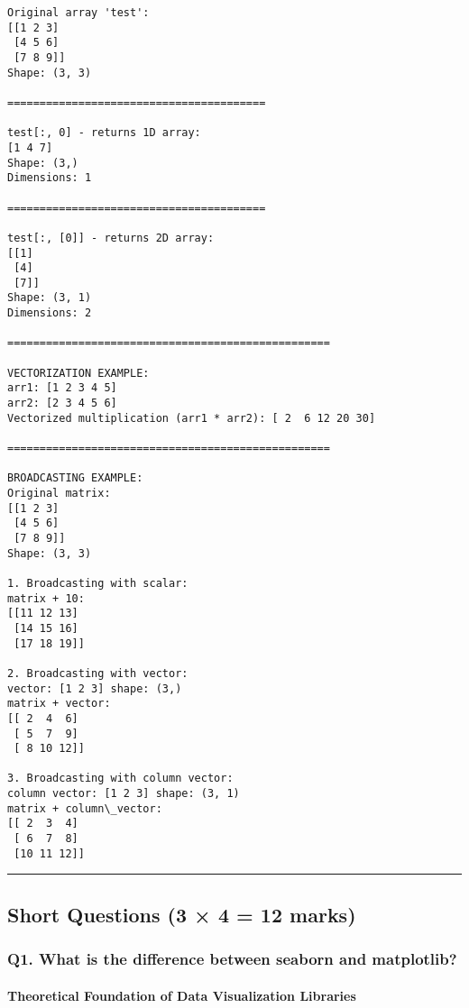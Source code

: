 \documentclass[11pt]{article}
\begin{document}
    \begin{Verbatim}[commandchars=\\\{\}]
Original array 'test':
[[1 2 3]
 [4 5 6]
 [7 8 9]]
Shape: (3, 3)

========================================

test[:, 0] - returns 1D array:
[1 4 7]
Shape: (3,)
Dimensions: 1

========================================

test[:, [0]] - returns 2D array:
[[1]
 [4]
 [7]]
Shape: (3, 1)
Dimensions: 2

==================================================

VECTORIZATION EXAMPLE:
arr1: [1 2 3 4 5]
arr2: [2 3 4 5 6]
Vectorized multiplication (arr1 * arr2): [ 2  6 12 20 30]

==================================================

BROADCASTING EXAMPLE:
Original matrix:
[[1 2 3]
 [4 5 6]
 [7 8 9]]
Shape: (3, 3)

1. Broadcasting with scalar:
matrix + 10:
[[11 12 13]
 [14 15 16]
 [17 18 19]]

2. Broadcasting with vector:
vector: [1 2 3] shape: (3,)
matrix + vector:
[[ 2  4  6]
 [ 5  7  9]
 [ 8 10 12]]

3. Broadcasting with column vector:
column vector: [1 2 3] shape: (3, 1)
matrix + column\_vector:
[[ 2  3  4]
 [ 6  7  8]
 [10 11 12]]
    \end{Verbatim}

    \begin{center}\rule{0.5\linewidth}{0.5pt}\end{center}

\subsection{Short Questions (3 × 4 = 12
marks)}\label{short-questions-3-4-12-marks}

\subsubsection{Q1. What is the difference between seaborn and
matplotlib?}\label{q1.-what-is-the-difference-between-seaborn-and-matplotlib}

\paragraph{Theoretical Foundation of Data Visualization
Libraries}\label{theoretical-foundation-of-data-visualization-libraries}
\end{document}
